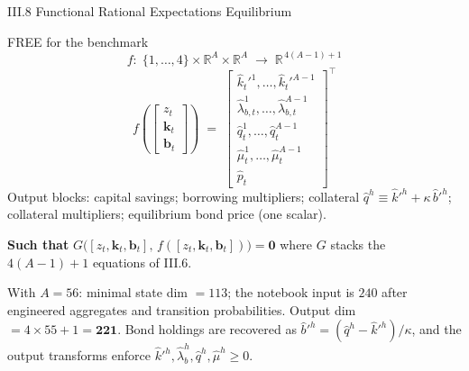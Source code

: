 \documentclass[aspectratio=169,11pt]{beamer}
\newcommand{\R}{\mathbb{R}}
\begin{document}
\begin{frame}{III.8 Functional Rational Expectations Equilibrium}
\small
\begin{exampleblock}{FREE for the benchmark}
\vspace{-3pt}
\[
f:\;\{1,\ldots,4\}\times \R^{A}\times \R^{A} \;\longrightarrow\; \R^{\,4(A-1)+1}
\]
\[
f\!\left(\!\begin{bmatrix} z_t \\ \bm{k}_t \\ \bm{b}_t \end{bmatrix}\!\right)
\;=\;
\begin{bmatrix}
\hat{k}_t'^1,\ldots,\hat{k}_t'^{A-1} \\
\hat\lambda_{b,t}^1,\ldots,\hat\lambda_{b,t}^{A-1} \\
\hat q_{t}^{1},\ldots,\hat q_{t}^{A-1} \\
\hat \mu_{t}^{1},\ldots,\hat \mu_{t}^{A-1} \\
\hat p_t
\end{bmatrix}^{\!\top}
\]
{\footnotesize Output blocks: capital savings; borrowing multipliers; collateral $\hat q^h \equiv \hat k'^h + \kappa\,\hat b'^h$; collateral multipliers; equilibrium bond price (one scalar).}
\vspace{-3pt}\end{exampleblock}

\textbf{Such that} $G\bigl([z_t, \bm{k}_t, \bm{b}_t],\,f([z_t, \bm{k}_t, \bm{b}_t])\bigr) = \bm{0}$ where $G$ stacks the $4(A-1)+1$ equations of III.6.

\vspace{0.3em}
{\footnotesize With $A = 56$: minimal state dim $=113$; the notebook input is $240$ after engineered aggregates and transition probabilities.  Output dim $=4\times55+1=\bm{221}$.  Bond holdings are recovered as $\hat b'^h=(\hat q^h-\hat k'^h)/\kappa$, and the output transforms enforce $\hat k'^h,\hat\lambda_b^h,\hat q^h,\hat\mu^h\ge0$.}
\end{frame}
\end{document}

